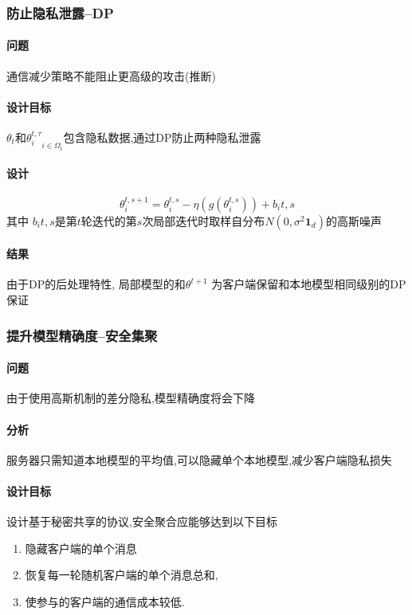 \documentclass[a4paper]{article}
\theoremstyle{definition}
\numberwithin{equation}{section}
\begin{document}
\subsubsection{防止隐私泄露--DP}

\paragraph{问题} 通信减少策略不能阻止更高级的攻击(推断)
\paragraph{设计目标} $\theta_t$和${\theta_i^{t, \tau}}_{i\in\Omega_t}$包含隐私数据,通过DP防止两种隐私泄露
\paragraph{设计}

\begin{equation}
    \theta_i^{t,s+1}= \theta_i^{t,s}- \eta (g(\theta_i^{t,s})) + b_i{t,s} 
    \label{local_iter}
\end{equation}
其中 $b_i{t,s}$是第$t$轮迭代的第$s$次局部迭代时取样自分布$N(0,\sigma^2 \mathbf{1}_d)$的高斯噪声

\paragraph{结果} 由于DP的后处理特性, 局部模型的和$\theta^{t+1}$ 为客户端保留和本地模型{\color{red}相同级别的DP保证 }

\subsubsection{提升模型精确度--安全集聚}

\paragraph{问题} 由于使用高斯机制的差分隐私,模型精确度将会下降
\paragraph{分析} 服务器只需知道本地模型的平均值,可以隐藏单个本地模型,减少客户端隐私损失
\paragraph{设计目标} 设计基于秘密共享的协议,安全聚合应能够达到以下目标
\begin{enumerate}[label=(\arabic*)]  
    \item 隐藏客户端的单个消息
    \item 恢复每一轮随机客户端的单个消息总和, 
    \item 使参与的客户端的通信成本较低. 
\end{enumerate}
\end{document}
